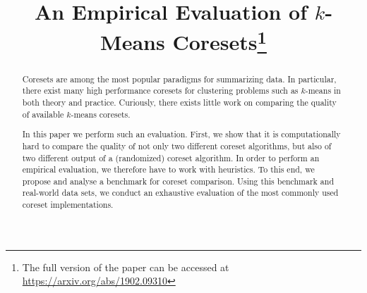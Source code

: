 \documentclass[twoside,leqno,twocolumn]{article}
\begin{document}
%
\newcommand\relatedversion{}
\renewcommand\relatedversion{\thanks{The full version of the paper can be accessed at \protect\url{https://arxiv.org/abs/1902.09310}}} %



\title{\Large An Empirical Evaluation of $k$-Means Coresets\relatedversion}
\author{
}

\date{}

\maketitle







\begin{abstract}  
Coresets are among the most popular paradigms for summarizing data. In particular, there exist many high performance coresets for clustering problems such as $k$-means in both theory and practice. Curiously, there exists little work on comparing the quality of available $k$-means coresets. 

In this paper we perform such an evaluation. First, we show that it is computationally hard to compare the quality of not only two different coreset algorithms, but also of two different output of a (randomized) coreset algorithm.
In order to perform an empirical evaluation, we therefore have to work with heuristics. 
To this end, we propose and analyse a benchmark for coreset comparison. Using this benchmark and real-world data sets, we conduct an exhaustive evaluation of the most commonly used coreset implementations.
\end{abstract}
\end{document}
